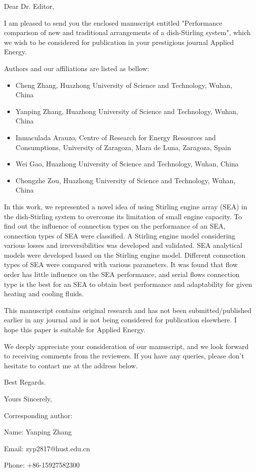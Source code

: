 \documentclass[12pt]{letter}
\begin{document}
Dear Dr. Editor,

I am pleased to send you the enclosed manuscript entitled "Performance comparison of new and traditional arrangements of a dish-Stirling system", which we wish to be considered for publication in your prestigious journal Applied Energy.

Authors and our affiliations are listed as bellow:

\begin{itemize}
  \item Cheng Zhang, Huazhong University of Science and Technology, Wuhan, China

  \item Yanping Zhang, Huazhong University of Science and Technology, Wuhan, China
  
  \item Inmaculada Arauzo, Centre of Research for Energy Resources and Consumptions, University of Zaragoza, Mara de Luna, Zaragoza, Spain
  
  \item Wei Gao, Huazhong University of Science and Technology, Wuhan, China
  
  \item Chongzhe Zou, Huazhong University of Science and Technology, Wuhan, China

\end{itemize}

In this work, we represented a novel idea of using Stirling engine array (SEA) in the dish-Stirling system to overcome its limitation of small engine capacity. To find out the influence of connection types on the performance of an SEA, connection types of SEA were classified. A Stirling engine model considering various losses and irreversibilities was developed and validated. SEA analytical models were developed based on the Stirling engine model. Different connection types of SEA were compared with various parameters. It was found that flow order has little influence on the SEA performance, and serial flows connection type is the best for an SEA to obtain best performance and adaptability for given heating and cooling fluids.

This manuscript contains original research and has not been submitted/published earlier in any journal and is not being considered for publication elsewhere. I hope this paper is suitable for Applied Energy.

We deeply appreciate your consideration of our manuscript, and we look forward to receiving comments from the reviewers. If you have any queries, please don't hesitate to contact me at the address below.

Best Regards.

Yours Sincerely,

Corresponding author:

Name: Yanping Zhang

Email: zyp2817@hust.edu.cn

Phone: +86-15927582300
\end{document}
